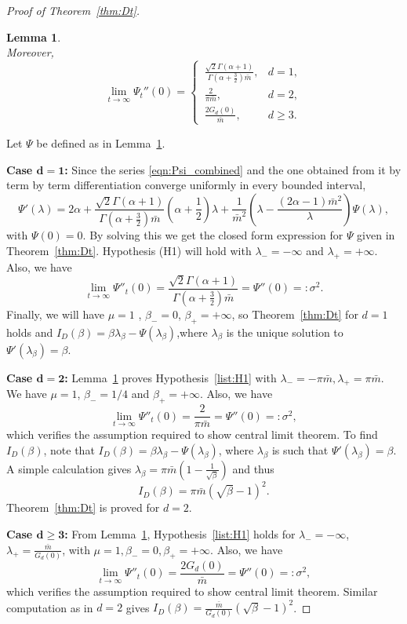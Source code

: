 \documentclass{article}[12pt]
\newtheorem{lemma}{Lemma}[section]
\theoremstyle{definition}
\newcommand{\1}{\mathbbm{1}}
\begin{document}
\begin{proof}[Proof of Theorem~\ref{thm:Dt}]
\begin{lemma}
\begin{equation}
\label{eqn:Psi_combined}
\end{equation}
Moreover,
\begin{equation}
\lim_{t\to\infty}\Psi_t''(0)=
	\begin{cases}
	\displaystyle
	\,\frac{\sqrt{2}\Gamma(\alpha+1)}{\Gamma\left(\alpha+\frac{3}{2}\right)\bar{m}},& d=1,\\[8pt]
	\displaystyle
	\,\frac{2}{\pi\bar{m}}, & d=2,\\[8pt]\displaystyle
	\,\frac{2G_d(0)}{\bar{m}},& d\geq3.
\end{cases}
\label{eqn:Psi_second_combined}
\end{equation}
\label{lm:DtCombined}
\end{lemma}
Let $\Psi$ be defined as in Lemma~\ref{lm:DtCombined}.

\textbf{Case $\mathbf{d=1}$: }Since the series \eqref{eqn:Psi_combined} and the one obtained from it by term by term differentiation converge uniformly in every bounded interval,
$$\Psi'(\lambda) = 2\alpha + \frac{\sqrt{2}\Gamma(\alpha+1)}{\Gamma(\alpha+\frac{3}{2})\bar{m}} \left(\alpha+\frac{1}{2}\right)\lambda+\frac{1}{\bar{m}^2}\left(\lambda - \frac{(2\alpha-1)\bar{m}^2}{\lambda}\right)\Psi(\lambda),$$
with $\Psi(0)=0$. By solving this we get the closed form expression for $\Psi$ given in Theorem~\ref{thm:Dt}. Hypothesis (H1) will hold with $\lambda_- = -\infty$ and $\lambda_+ = +\infty$.  Also, we have $$\lim_{t\to \infty}\Psi''_t(0) =\frac{\sqrt{2}\Gamma(\alpha+1)}{\Gamma(\alpha+\frac{3}{2})\bar{m}} =\Psi''(0) =: \sigma^2.$$ Finally, we will have $\mu = 1$ , $\beta_- =0$, $\beta_+ = +\infty$, so Theorem~\ref{thm:Dt} for $d=1$ holds and $I_D(\beta) = \beta \lambda_\beta - \Psi(\lambda_\beta)$,where $\lambda_\beta$ is the unique solution to $\Psi'(\lambda_\beta) = \beta$.

\textbf{Case $\mathbf{d=2}$: } Lemma~\ref{lm:DtCombined} proves Hypothesis~\ref{list:H1} with $\lambda_- = -\pi \bar{m}, \lambda_+ = \pi\bar{m}$. We have $\mu = 1$, $\beta_- = 1/4$ and $\beta_+ = +\infty$. Also, we have $$\lim_{t\to \infty}\Psi''_t(0) =\frac{2}{\pi\bar{m}} =\Psi''(0) =: \sigma^2,$$ which verifies the assumption required to show central limit theorem.
To find $I_D(\beta)$, note that $I_D(\beta) = \beta\lambda_\beta - \Psi(\lambda_\beta)$, where $\lambda_\beta$ is such that $\Psi'(\lambda_\beta) = \beta$.  A simple calculation gives $\lambda_\beta = \pi\bar{m}\left(1-\frac{1}{\sqrt{\beta}}\right)$ and thus 
$$I_D(\beta) = \pi\bar{m}(\sqrt{\beta}-1)^2.$$
Theorem~\ref{thm:Dt} is proved for $d=2$.

\textbf{Case $\mathbf{d\ge3}$: } From Lemma~\ref{lm:DtCombined}, Hypothesis~\ref{list:H1} holds for $\lambda_- = -\infty$, $\lambda_+ = \frac{\bar{m}}{G_d(0)}$, with $\mu = 1, \beta_- = 0, \beta_+=+\infty$. Also, we have $$\lim_{t\to \infty}\Psi''_t(0) =\frac{2G_d(0)}{\bar{m}} =\Psi''(0) =: \sigma^2,$$ which verifies the assumption required to show central limit theorem. Similar computation as in $d=2$ gives $I_D(\beta) = \frac{\bar{m}}{G_d(0)}(\sqrt{\beta}-1)^2$.
\end{proof}
\end{document}
